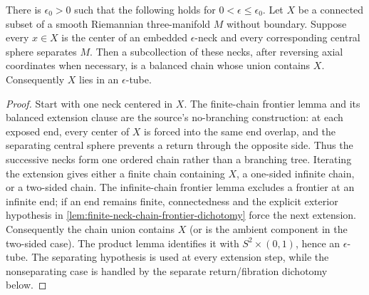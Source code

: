 \begin{theorem}
\label{thm:separating-neck-centers-form-tube}
\notready
There is $\epsilon_0>0$ such that the following holds for
$0<\epsilon\le\epsilon_0$.  Let $X$ be a connected subset of a smooth
Riemannian three-manifold $M$ without boundary.  Suppose every $x\in X$ is
the center of an embedded $\epsilon$-neck and every corresponding central
sphere separates $M$.
Then a subcollection of these necks, after reversing axial coordinates when
necessary, is a balanced chain whose union contains $X$.  Consequently
$X$ lies in an $\epsilon$-tube.
\end{theorem}

\begin{proof}
Start with one neck centered in $X$.  The finite-chain frontier lemma and its
balanced extension clause are the source's no-branching construction: at each
exposed end, every center of $X$ is forced into the same end overlap, and the
separating central sphere prevents a return through the opposite side.  Thus
the successive necks form one ordered chain rather than a branching tree.
Iterating the extension gives either a finite chain containing $X$, a
one-sided infinite chain, or a two-sided chain.  The infinite-chain frontier
lemma excludes a frontier at an infinite end; if an end remains finite,
connectedness and the explicit exterior hypothesis in
\ref{lem:finite-neck-chain-frontier-dichotomy} force the next extension.
  Consequently the chain union contains $X$ (or is the ambient component in the
  two-sided case).  The product lemma identifies it with
  $S^2\times(0,1)$, hence an $\epsilon$-tube.  The separating hypothesis is
  used at every extension step, while the nonseparating case is handled by the
  separate return/fibration dichotomy below.
\end{proof}

